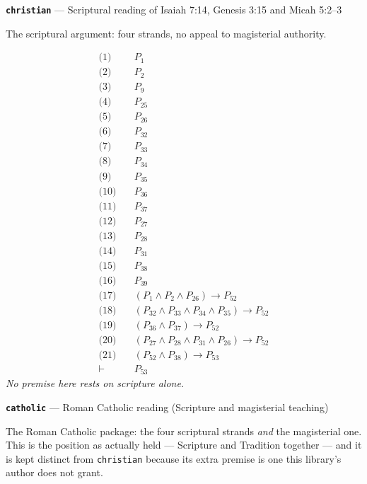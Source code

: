 \documentclass[11pt]{article}
\begin{document}
\par\medskip\noindent\textbf{\texttt{christian}} --- Scriptural reading of Isaiah 7:14, Genesis 3:15 and Micah 5:2–3\par\nobreak\noindent
The scriptural argument: four strands, no appeal to magisterial authority.

\begin{align*}
  \text{(1)} \quad & P_{1} \\
  \text{(2)} \quad & P_{2} \\
  \text{(3)} \quad & P_{9} \\
  \text{(4)} \quad & P_{25} \\
  \text{(5)} \quad & P_{26} \\
  \text{(6)} \quad & P_{32} \\
  \text{(7)} \quad & P_{33} \\
  \text{(8)} \quad & P_{34} \\
  \text{(9)} \quad & P_{35} \\
  \text{(10)} \quad & P_{36} \\
  \text{(11)} \quad & P_{37} \\
  \text{(12)} \quad & P_{27} \\
  \text{(13)} \quad & P_{28} \\
  \text{(14)} \quad & P_{31} \\
  \text{(15)} \quad & P_{38} \\
  \text{(16)} \quad & P_{39} \\
  \text{(17)} \quad & (P_{1} \land P_{2} \land P_{26}) \rightarrow P_{52} \\
  \text{(18)} \quad & (P_{32} \land P_{33} \land P_{34} \land P_{35}) \rightarrow P_{52} \\
  \text{(19)} \quad & (P_{36} \land P_{37}) \rightarrow P_{52} \\
  \text{(20)} \quad & (P_{27} \land P_{28} \land P_{31} \land P_{26}) \rightarrow P_{52} \\
  \text{(21)} \quad & (P_{52} \land P_{38}) \rightarrow P_{53} \\
  \vdash \quad & P_{53}
\end{align*}
\emph{No premise here rests on scripture alone.}
\par\medskip\noindent\textbf{\texttt{catholic}} --- Roman Catholic reading (Scripture and magisterial teaching)\par\nobreak\noindent
The Roman Catholic package: the four scriptural strands \emph{and} the magisterial one. This is the position as actually held — Scripture and Tradition together — and it is kept distinct from \texttt{christian} because its extra premise is one this library's author does not grant.
\end{document}
